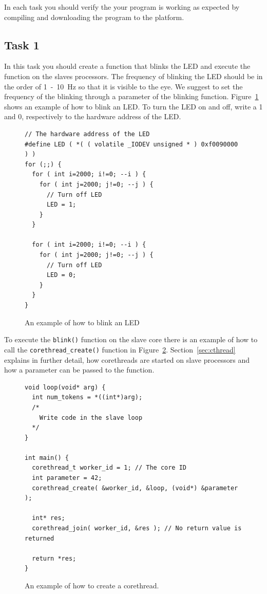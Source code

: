 \documentclass[a4paper,fontsize=10pt,twoside,DIV15,BCOR12mm,headinclude=true,footinclude=false,pagesize,bibtotoc]{scrbook}
\newcommand{\code}[1]{{\texttt{#1}}}
\begin{document}
\noindent In each task you should verify the your program is working as expected by compiling and downloading the program to the platform.

\subsection{Task 1}
In this task you should create a function that blinks the LED and execute the function on the slaves processors.
The frequency of blinking the LED should be in the order of 1~-~10~Hz so that it is visible to the eye.
We suggest to set the frequency of the blinking through a parameter of the blinking function.
Figure~\ref{fig:ctrl_led} shows an example of how to blink an LED.
To turn the LED on and off, write a 1 and 0, respectively to the hardware address of the LED. 

\begin{figure}
\begin{Verbatim}[xleftmargin=1cm,xrightmargin=1cm,frame=single,framesep=3mm]
// The hardware address of the LED
#define LED ( *( ( volatile _IODEV unsigned * ) 0xf0090000 ) )
for (;;) {
  for ( int i=2000; i!=0; --i ) {
    for ( int j=2000; j!=0; --j ) {
      // Turn off LED
      LED = 1;
    }
  }

  for ( int i=2000; i!=0; --i ) {
    for ( int j=2000; j!=0; --j ) {
      // Turn off LED
      LED = 0;
    }
  }
}
\end{Verbatim}
\caption{\label{fig:ctrl_led}An example of how to blink an LED}
\end{figure}

To execute the \code{blink()} function on the slave core there is an example of
how to call the \code{corethread\_create()} function in Figure~\ref{fig:corethread}.
Section~\ref{sec:cthread} explains in further detail, how corethreads are started
on slave processors and how a parameter can be passed to the function.

\begin{figure}
\begin{Verbatim}[xleftmargin=1cm,xrightmargin=1cm,frame=single,framesep=3mm]
void loop(void* arg) {
  int num_tokens = *((int*)arg);
  /*
    Write code in the slave loop
  */
}

int main() {
  corethread_t worker_id = 1; // The core ID
  int parameter = 42;
  corethread_create( &worker_id, &loop, (void*) &parameter );  

  int* res;
  corethread_join( worker_id, &res ); // No return value is returned

  return *res;  
}
\end{Verbatim}
\caption{\label{fig:corethread}An example of how to create a corethread.}
\end{figure}
\end{document}
